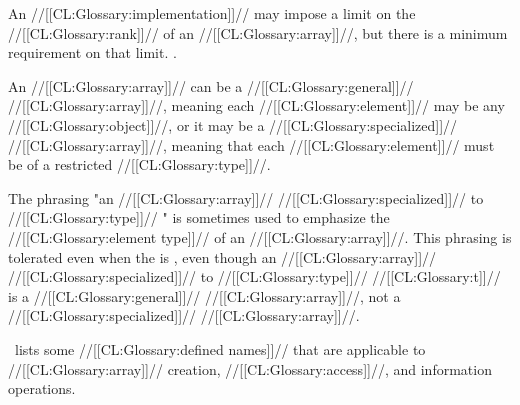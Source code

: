 \endsubsubsubsubsection%


An //[[CL:Glossary:implementation]]// may impose a limit on the //[[CL:Glossary:rank]]// of an //[[CL:Glossary:array]]//,
but there is a minimum requirement on that limit.  .

\endsubsubsubsubsection%

\endsubsubsubsection%

\endsubsubsection%

\endsubsection%



An //[[CL:Glossary:array]]// can be a //[[CL:Glossary:general]]// //[[CL:Glossary:array]]//, 
    meaning each //[[CL:Glossary:element]]// may be any //[[CL:Glossary:object]]//,
or it may be a //[[CL:Glossary:specialized]]// //[[CL:Glossary:array]]//,
    meaning that each //[[CL:Glossary:element]]// must be of a restricted //[[CL:Glossary:type]]//.

The phrasing "an //[[CL:Glossary:array]]// //[[CL:Glossary:specialized]]// to //[[CL:Glossary:type]]// "
is sometimes used to emphasize the //[[CL:Glossary:element type]]// of an //[[CL:Glossary:array]]//.
This phrasing is tolerated even when the  is ,
even though an //[[CL:Glossary:array]]// //[[CL:Glossary:specialized]]// to //[[CL:Glossary:type]]// //[[CL:Glossary:t]]//
is a //[[CL:Glossary:general]]// //[[CL:Glossary:array]]//, not a //[[CL:Glossary:specialized]]// //[[CL:Glossary:array]]//.

\Thenextfigure\ lists some //[[CL:Glossary:defined names]]// that are applicable to //[[CL:Glossary:array]]// 
creation, //[[CL:Glossary:access]]//, and information operations.




